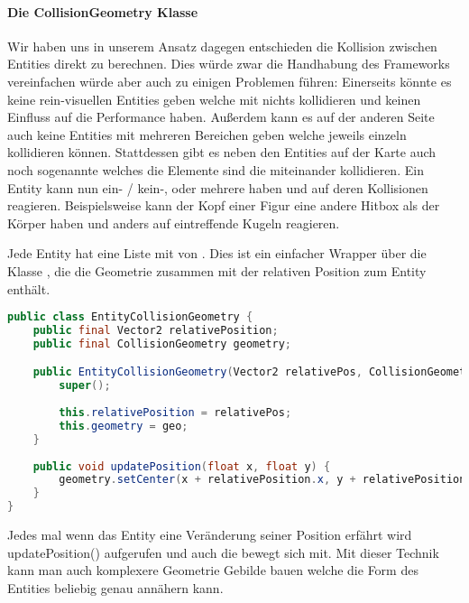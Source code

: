 \paragraph{Die CollisionGeometry Klasse}

Wir haben uns in unserem Ansatz dagegen entschieden die Kollision zwischen Entities direkt zu berechnen. Dies würde zwar die Handhabung des Frameworks vereinfachen würde aber auch zu einigen Problemen führen: Einerseits könnte es keine rein-visuellen Entities geben welche mit nichts kollidieren und keinen Einfluss auf die Performance haben. Außerdem kann es auf der anderen Seite auch keine Entities mit mehreren Bereichen geben welche jeweils einzeln kollidieren können. 
Stattdessen gibt es neben den Entities auf der Karte auch noch sogenannte  welches die Elemente sind die miteinander kollidieren.
Ein Entity kann nun ein- / kein-, oder mehrere  haben und auf deren Kollisionen reagieren. Beispielsweise kann der Kopf einer Figur eine andere Hitbox als der Körper haben und anders auf eintreffende Kugeln reagieren.

Jede Entity hat eine Liste mit von . Dies ist ein einfacher Wrapper über die Klasse , die die Geometrie zusammen mit der relativen Position zum Entity enthält.

\begin{lstlisting}[caption=Die Klasse EntityCollisionGeometry, title=\hspace{0 pt}, language=java]
public class EntityCollisionGeometry {
	public final Vector2 relativePosition;
	public final CollisionGeometry geometry;

	public EntityCollisionGeometry(Vector2 relativePos, CollisionGeometry geo) {
		super();
		
		this.relativePosition = relativePos;
		this.geometry = geo;
	}
	
	public void updatePosition(float x, float y) {
		geometry.setCenter(x + relativePosition.x, y + relativePosition.y);
	}
}
\end{lstlisting}

Jedes mal wenn das Entity eine Veränderung seiner Position erfährt wird updatePosition() aufgerufen und auch die  bewegt sich mit.
Mit dieser Technik kann man auch komplexere Geometrie Gebilde bauen welche die Form des Entities beliebig genau annähern kann. \cite[S 500]{DGIJ}


